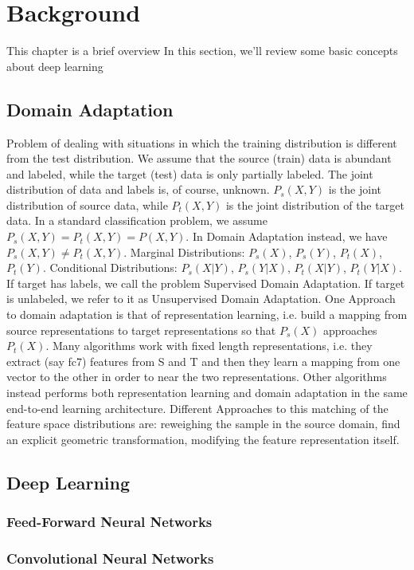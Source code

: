 \documentclass[../main.tex]{subfiles}
\begin{document}
    \chapter{Background}
    This chapter is a brief overview
    In this section, we'll review some basic concepts about deep learning

    \section{Domain Adaptation}
    Problem of dealing with situations in which the training distribution is different from the test distribution.
    We assume that the source (train) data is abundant and labeled, while the target (test) data is only partially
    labeled. The joint distribution of data and labels is, of course, unknown. $ P_{s}(X, Y) $ is the joint distribution
    of source data, while $ P_{t}(X, Y) $ is the joint distribution of the target data. In a standard classification
    problem, we assume $ P_{s}(X, Y) = P_{t}(X, Y) = P(X, Y) $. In Domain Adaptation instead, we have $ P_{s}(X, Y) \neq P_{t}(X, Y) $.
    Marginal Distributions: $ P_{s}(X) $, $ P_{s}(Y) $, $ P_{t}(X) $, $ P_{t}(Y) $.
    Conditional Distributions: $ P_{s}(X | Y) $, $ P_{s}(Y | X) $, $ P_{t}(X | Y) $, $ P_{t}(Y | X) $.
    If target has labels, we call the problem Supervised Domain Adaptation. If target is unlabeled, we refer to it as Unsupervised Domain
    Adaptation.
    One Approach to domain adaptation is that of representation learning, i.e. build a mapping from source representations to target
    representations so that $ P_{s}(X) $ approaches $ P_{t}(X) $. Many algorithms work with fixed length representations, i.e. they
    extract (say fc7) features from S and T and then they learn a mapping from one vector to the other in order to near the two
    representations. Other algorithms instead performs both representation learning and domain adaptation in the same end-to-end
    learning architecture.
    Different Approaches to this matching of the feature space distributions are: reweighing the sample in the source domain, find
    an explicit geometric transformation, modifying the feature representation itself.

    \section{Deep Learning}
    \subsection{Feed-Forward Neural Networks}
    \subsection{Convolutional Neural Networks}
\end{document}
